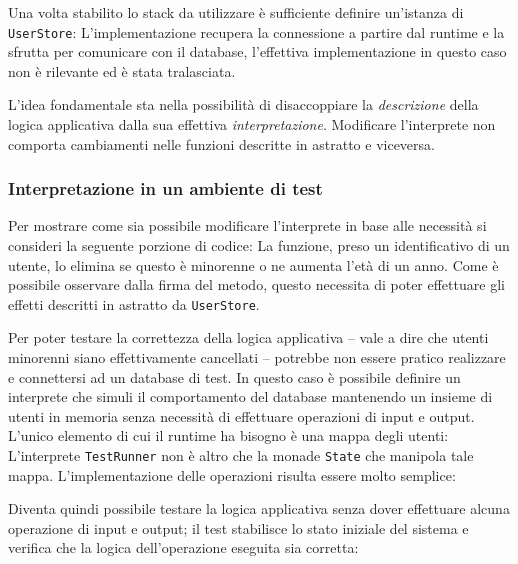 Una volta stabilito lo stack da utilizzare è sufficiente definire un'istanza di \lstinline{UserStore}:
L'implementazione recupera la connessione a partire dal runtime e la sfrutta per comunicare con il database, l'effettiva implementazione in questo caso non è rilevante ed è stata tralasciata.

L'idea fondamentale sta nella possibilità di disaccoppiare la \emph{descrizione} della logica applicativa dalla sua effettiva \emph{interpretazione}. Modificare l'interprete non comporta cambiamenti nelle funzioni descritte in astratto e viceversa.

\subsubsection{Interpretazione in un ambiente di test}
Per mostrare come sia possibile modificare l'interprete in base alle necessità si consideri la seguente porzione di codice:
La funzione, preso un identificativo di un utente, lo elimina se questo è minorenne o ne aumenta l'età di un anno. Come è possibile osservare dalla firma del metodo, questo necessita di poter effettuare gli effetti descritti in astratto da \lstinline{UserStore}.

Per poter testare la correttezza della logica applicativa -- vale a dire che utenti minorenni siano effettivamente cancellati -- potrebbe non essere pratico realizzare e connettersi ad un database di test. In questo caso è possibile definire un interprete che simuli il comportamento del database mantenendo un insieme di utenti in memoria senza necessità di effettuare operazioni di input e output. L'unico elemento di cui il runtime ha bisogno è una mappa degli utenti:
L'interprete \lstinline{TestRunner} non è altro che la monade \lstinline{State} che manipola tale mappa. L'implementazione delle operazioni risulta essere molto semplice:

Diventa quindi possibile testare la logica applicativa senza dover effettuare alcuna operazione di input e output; il test stabilisce lo stato iniziale del sistema e verifica che la logica dell'operazione eseguita sia corretta:
